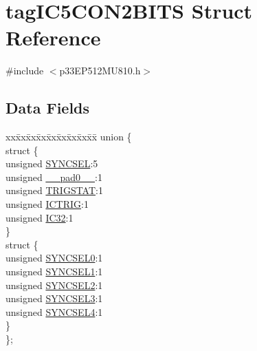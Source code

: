 \hypertarget{structtag_i_c5_c_o_n2_b_i_t_s}{}\section{tag\+I\+C5\+C\+O\+N2\+B\+I\+TS Struct Reference}
\label{structtag_i_c5_c_o_n2_b_i_t_s}


{\ttfamily \#include $<$p33\+E\+P512\+M\+U810.\+h$>$}

\subsection*{Data Fields}
\begin{DoxyCompactItemize}
\item 
\begin{tabbing}
xx\=xx\=xx\=xx\=xx\=xx\=xx\=xx\=xx\=\kill
union \{\\
\>struct \{\\
\>\>unsigned \hyperlink{structtag_i_c5_c_o_n2_b_i_t_s_a35fbbe11485c2615ed27535b62c3fa35}{SYNCSEL}:5\\
\>\>unsigned \hyperlink{structtag_i_c5_c_o_n2_b_i_t_s_adf71f3d8410c1f1dbbc96680a92c49af}{\_\_pad0\_\_}:1\\
\>\>unsigned \hyperlink{structtag_i_c5_c_o_n2_b_i_t_s_ab379549de54ac93ad4aa73686c34cb7c}{TRIGSTAT}:1\\
\>\>unsigned \hyperlink{structtag_i_c5_c_o_n2_b_i_t_s_a79bd14cfd2e403f3a96ce0b3bb58097b}{ICTRIG}:1\\
\>\>unsigned \hyperlink{structtag_i_c5_c_o_n2_b_i_t_s_afc705120246cb4ca0c93c87817519b7f}{IC32}:1\\
\>\} \\
\>struct \{\\
\>\>unsigned \hyperlink{structtag_i_c5_c_o_n2_b_i_t_s_a3b5df3154fde5141e6ac0156425ff8b4}{SYNCSEL0}:1\\
\>\>unsigned \hyperlink{structtag_i_c5_c_o_n2_b_i_t_s_a50e73f95ab1c258ddc64f69c0991deaf}{SYNCSEL1}:1\\
\>\>unsigned \hyperlink{structtag_i_c5_c_o_n2_b_i_t_s_a304907a5d2c4cbf1114a54642a85951e}{SYNCSEL2}:1\\
\>\>unsigned \hyperlink{structtag_i_c5_c_o_n2_b_i_t_s_a6bbd1bd2ead6c9fa713969c6eb0f0c75}{SYNCSEL3}:1\\
\>\>unsigned \hyperlink{structtag_i_c5_c_o_n2_b_i_t_s_a0cd5bbe196c7974953909d27a6307bb7}{SYNCSEL4}:1\\
\>\} \\
\}; \\

\end{tabbing}\end{DoxyCompactItemize}


